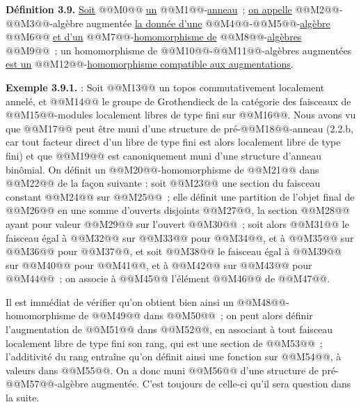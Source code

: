 
\textbf{Définition 3.9.} \uline{Soit} @@M0@@ \uline{un} @@M1@@-\uline{anneau}~; \uline{on appelle} @@M2@@-@@M3@@-algèbre augmentée \uline{la donnée d'une} @@M4@@-@@M5@@-\uline{algèbre} @@M6@@ \uline{et d'un} @@M7@@-\uline{homomorphisme de} @@M8@@-\uline{algèbres} @@M9@@~; un homomorphisme de @@M10@@-@@M11@@-algèbres augmentées \uline{est un} @@M12@@-\uline{homomorphisme compatible aux augmentations}.

\textbf{Exemple 3.9.1.} : Soit @@M13@@ un topos commutativement localement annelé, et @@M14@@ le groupe de Grothendieck de la catégorie des faisceaux de @@M15@@-modules localement libres de type fini sur @@M16@@. Nous avons vu que @@M17@@ peut être muni d'une structure de pré-@@M18@@-anneau (2.2.b, car tout facteur direct d'un libre de type fini est alors localement libre de type fini) et que @@M19@@ est canoniquement muni d'une structure d'anneau binômial. On définit un @@M20@@-homomorphisme de @@M21@@ dans @@M22@@ de la façon suivante : soit @@M23@@ une section du faisceau constant @@M24@@ sur @@M25@@~; elle définit une partition de l'objet final de @@M26@@ en une somme d'ouverts disjoints @@M27@@, la section @@M28@@ ayant pour valeur @@M29@@ sur l'ouvert @@M30@@~; soit alors @@M31@@ le faisceau égal à @@M32@@ sur @@M33@@ pour @@M34@@, et à @@M35@@ sur @@M36@@ pour @@M37@@, et soit @@M38@@ le faisceau égal à @@M39@@ sur @@M40@@ pour @@M41@@, et à @@M42@@ sur @@M43@@ pour @@M44@@~; on associe à @@M45@@ l'élément @@M46@@ de @@M47@@.

Il est immédiat de vérifier qu'on obtient bien ainsi un @@M48@@-homomorphisme de @@M49@@ dans @@M50@@~; on peut alors définir l'augmentation de @@M51@@ dans @@M52@@, en associant à tout faisceau localement libre de type fini son rang, qui est une section de @@M53@@~; l'additivité du rang entraîne qu'on définit ainsi une fonction sur @@M54@@, à valeurs dans @@M55@@. On a donc muni @@M56@@ d'une structure de pré-@@M57@@-algèbre augmentée. C'est toujours de celle-ci qu'il sera question dans la suite.


